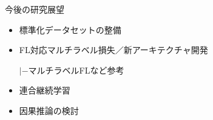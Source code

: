 \documentclass[unicode,12pt,aspectratio=169,dvipdfmx]{beamer}
\begin{document}
\begin{frame}{今後の研究展望}
  \begin{itemize}
    \item 標準化データセットの整備
    \item FL対応マルチラベル損失／新アーキテクチャ開発

    $|-$マルチラベルFLなど参考
    \item 連合継続学習
    \item 因果推論の検討
  \end{itemize}
\end{frame}
\appendix 
\end{document}
